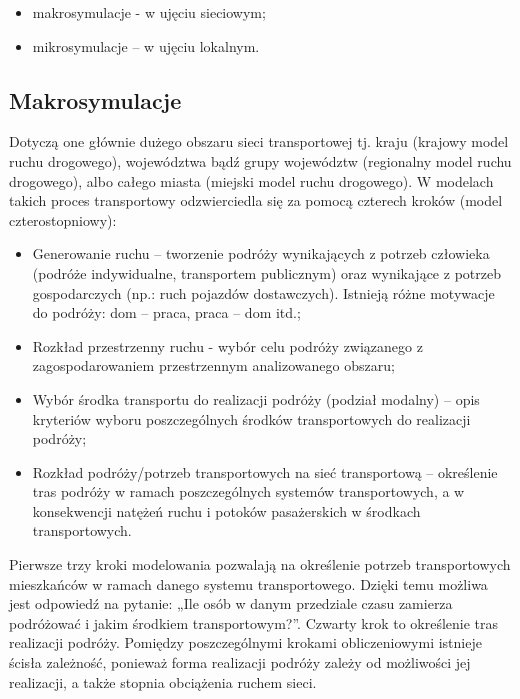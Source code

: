 \documentclass{sprawozdanie-agh}
\begin{document}
		\begin{itemize}
			\item makrosymulacje - w ujęciu sieciowym;
			\item mikrosymulacje – w ujęciu lokalnym.
		\end{itemize}


		\subsection{Makrosymulacje} 
		Dotyczą one głównie dużego obszaru sieci transportowej tj. kraju (krajowy model ruchu drogowego), województwa bądź grupy województw (regionalny model ruchu drogowego), albo całego miasta (miejski model ruchu drogowego). W modelach takich proces transportowy odzwierciedla się za pomocą czterech kroków (model czterostopniowy):

		\begin{itemize}
			\item  Generowanie ruchu – tworzenie podróży wynikających z potrzeb człowieka (podróże indywidualne, transportem publicznym) oraz wynikające z potrzeb gospodarczych (np.: ruch pojazdów dostawczych). Istnieją różne motywacje do podróży: dom – praca, praca – dom itd.;
			\item Rozkład przestrzenny ruchu - wybór celu podróży związanego z zagospodarowaniem przestrzennym analizowanego obszaru;
			\item Wybór środka transportu do realizacji podróży (podział modalny) – opis kryteriów wyboru poszczególnych środków transportowych do realizacji podróży;
			\item Rozkład podróży/potrzeb transportowych na sieć transportową – określenie tras podróży w ramach poszczególnych systemów transportowych, a w konsekwencji natężeń ruchu i potoków pasażerskich w środkach transportowych.
		\end{itemize}

		Pierwsze trzy kroki modelowania pozwalają na określenie potrzeb transportowych mieszkańców w ramach danego systemu transportowego. Dzięki temu możliwa jest odpowiedź na pytanie: „Ile osób w danym przedziale czasu zamierza podróżować i jakim środkiem transportowym?”. Czwarty krok to określenie tras realizacji podróży. Pomiędzy poszczególnymi krokami obliczeniowymi istnieje ścisła zależność, ponieważ forma realizacji podróży zależy od możliwości jej realizacji, a także stopnia obciążenia ruchem sieci.
\end{document}
